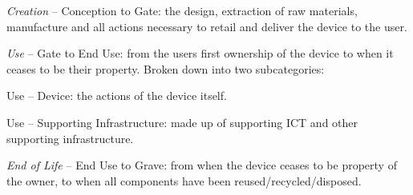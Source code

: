 \documentclass[conference]{IEEEtran}
\begin{document}
\begin{compactitem}
\item {\emph{Creation}} -- Conception to Gate: the design, extraction of raw
  materials, manufacture and all actions necessary to retail and
  deliver the device to the user.
\item {\emph{Use}} -- Gate to End Use: from the users first ownership
  of the device to when it ceases to be their property. Broken down
  into two subcategories:
\begin{compactitem}
\item Use -- Device: the actions of the device itself.
\item Use -- Supporting Infrastructure: made up of supporting ICT and
  other supporting infrastructure.
\end{compactitem}
\item {\emph{End of Life}} -- End Use to Grave: from when the device
  ceases to be property of the owner, to when all components have been
  reused/recycled/disposed.
\end{compactitem}






\end{document}
